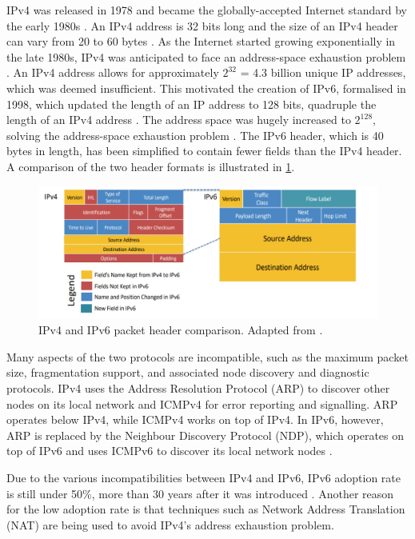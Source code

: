 IPv4 was released in 1978 and became the globally-accepted Internet standard by the early 1980s \cite{IPv4}. An IPv4 address is 32 bits long and the size of an IPv4 header can vary from 20 to 60 bytes \cite{lectures}. As the Internet started growing exponentially in the late 1980s, IPv4 was anticipated to face an address-space exhaustion problem \cite{IPv6}.  An IPv4 address allows for approximately $2^{32}$ = 4.3 billion unique IP addresses, which was deemed insufficient. This motivated the creation of IPv6, formalised in 1998, which updated the length of an IP address to 128 bits, quadruple the length of an IPv4 address \cite{IPv6}. The address space was hugely increased to $2^{128}$, solving the address-space exhaustion problem \cite{IPv6Paper}. The IPv6 header, which is 40 bytes in length, has been simplified to contain fewer fields than the IPv4 header. A comparison of the two header formats is illustrated in \cref{fig:intro-headers}.

\begin{figure}[htbp]
  \centering
    \includegraphics[width=1\textwidth]{figures/introduction/ipv46.jpg}
     \caption{ IPv4 and IPv6 packet header comparison. Adapted from \cite{lectures}.}
     \label{fig:intro-headers}
\end{figure}

Many aspects of the two protocols are incompatible, such as the maximum packet size, fragmentation support, and associated node discovery and diagnostic protocols. IPv4 uses the Address Resolution Protocol (ARP) to discover other nodes on its local network and ICMPv4 for error reporting and signalling. ARP operates below IPv4, while ICMPv4 works on top of IPv4. In IPv6, however, ARP is replaced by the Neighbour Discovery Protocol (NDP), which operates on top of IPv6 and uses ICMPv6 to discover its local network nodes \cite{lectures}.

Due to the various incompatibilities between IPv4 and IPv6, IPv6 adoption rate is still under 50\%, more than 30 years after it was introduced \cite{IPv6Adoption}. Another reason for the low adoption rate is that techniques such as Network Address Translation (NAT) are being used to avoid IPv4's address exhaustion problem. 

